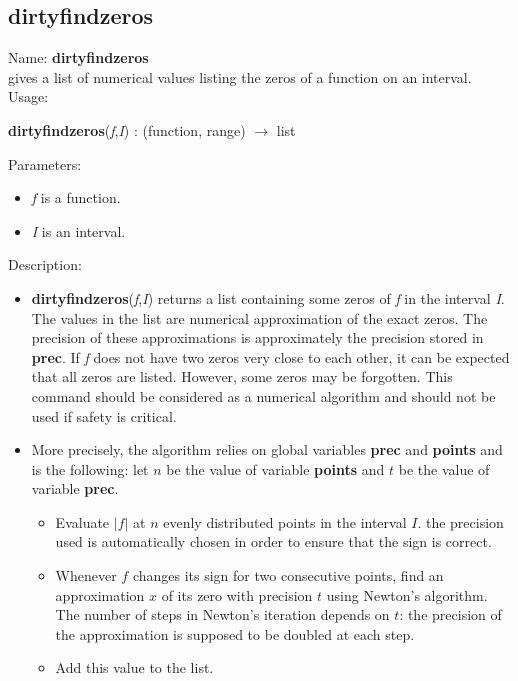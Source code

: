 \subsection{dirtyfindzeros}
\label{labdirtyfindzeros}
\noindent Name: \textbf{dirtyfindzeros}\\
gives a list of numerical values listing the zeros of a function on an interval.\\

\noindent Usage: 
\begin{center}
\textbf{dirtyfindzeros}(\emph{f},\emph{I}) : (\textsf{function}, \textsf{range}) $\rightarrow$ \textsf{list}\\
\end{center}
Parameters: 
\begin{itemize}
\item \emph{f} is a function.
\item \emph{I} is an interval.
\end{itemize}
\noindent Description: \begin{itemize}

\item \textbf{dirtyfindzeros}(\emph{f},\emph{I}) returns a list containing some zeros of \emph{f} in the
   interval \emph{I}. The values in the list are numerical approximation of the exact
   zeros. The precision of these approximations is approximately the precision
   stored in \textbf{prec}. If \emph{f} does not have two zeros very close to each other, it 
   can be expected that all zeros are listed. However, some zeros may be
   forgotten. This command should be considered as a numerical algorithm and
   should not be used if safety is critical.

\item More precisely, the algorithm relies on global variables \textbf{prec} and \textbf{points} and
   is the following: let $n$ be the value of variable \textbf{points} and $t$ be the value
   of variable \textbf{prec}.
   \begin{itemize}
   \item  Evaluate $|f|$ at $n$ evenly distributed points in the interval $I$.
     the precision used is automatically chosen in order to ensure that the sign
     is correct.
   \item  Whenever $f$ changes its sign for two consecutive points,
     find an approximation $x$ of its zero with precision $t$ using
     Newton's algorithm. The number of steps in Newton's iteration depends on $t$:
     the precision of the approximation is supposed to be doubled at each step.
   \item  Add this value to the list.
   \end{itemize}
\end{itemize}
